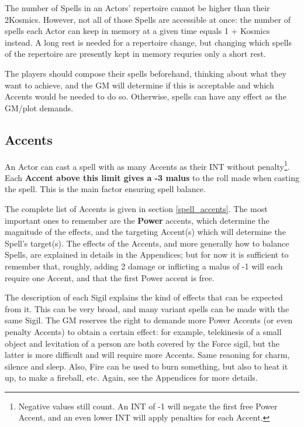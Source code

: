 The number of Spells in an Actors' repertoire cannot be higher than their 2\texttimes Kosmics. However, not all of those Spells are accessible at once: the number of spells each Actor can keep in memory at a given time equals 1 + Kosmics instead. A long rest is needed for a repertoire change, but changing which spells of the repertoire are presently kept in memory requries only a short rest.

The players should compose their spells beforehand, thinking about what they want to achieve, and the GM will determine if this is acceptable and which Accents would be needed to do so. Otherwise, spells can have any effect as the GM/plot demands.


\subsection{Accents}

An Actor can cast a spell with as many Accents as their INT without penalty\footnote{Negative values still count. An INT of -1 will negate the first free Power Accent, and an even lower INT will apply penalties for each Accent.}. Each \textbf{Accent above this limit gives a -3 malus} to the roll made when casting the spell. This is the main factor ensuring spell balance.

The complete list of Accents is given in section \ref{spell_accents}. The most important ones to remember are the \textbf{Power} accents, which determine the magnitude of the effects, and the targeting Accent(s) which will determine the Spell's target(s). The effects of the Accents, and more generally how to balance Spells, are explained in details in the Appendices; but for now it is sufficient to remember that, roughly, adding 2 damage or inflicting a malus of -1 will each require one Accent, and that the first Power accent is free. 

The description of each Sigil explains the kind of effects that can be expected from it. This can be very broad, and many variant spells can be made with the same Sigil. The GM reserves the right to demande more Power Accents (or even penalty Accents) to obtain a certain effect: for example, telekinesis of a small object and levitation of a person are both covered by the Force sigil, but the latter is more difficult and will require more Accents. Same reaoning for charm, silence and sleep. Also, Fire can be used to burn something, but also to heat it up, to make a fireball, etc. Again, see the Appendices for more details.

